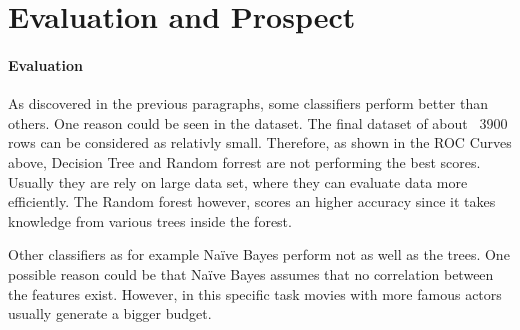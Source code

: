 \section{Evaluation and Prospect}
\paragraph{Evaluation}
\label{cha:prospect}
As discovered in the previous paragraphs, some classifiers perform better than others. One reason could be seen in the dataset. The final dataset of about ~3900 rows can be considered as relativly small. Therefore, as shown in the ROC Curves above, Decision Tree and Random forrest are not performing the best scores. Usually they are rely on large data set, where they can evaluate data more efficiently. The Random forest however, scores an higher accuracy since it takes knowledge from various trees inside the forest.

Other classifiers as for example Na\"{i}ve Bayes perform not as well as the trees. One possible reason could be that Na\"{i}ve Bayes assumes that no correlation between the features exist. However, in this specific task movies with more famous actors usually generate a bigger budget. 








